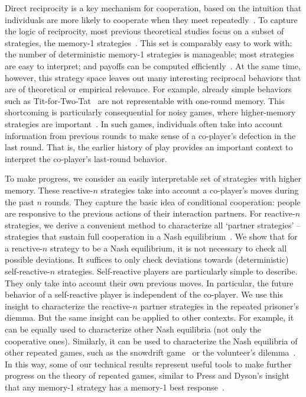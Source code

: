 \documentclass[11pt]{article}
\begin{document}
Direct reciprocity is a key mechanism for cooperation, based on the intuition that individuals are more likely to cooperate when they meet repeatedly~\citep{nowak:Science:2006}.
To capture the logic of reciprocity, most previous theoretical studies focus on a subset of strategies, the  memory-1 strategies~\citep{nowak:Nature:1993,imhof:PNAS:2005,grujic:jtb:2012,van-segbroeck:prl:2012,press:PNAS:2012,stewart:pnas:2013,Toupo:IJBC:2014,stewart:pnas:2014, akin:EGADS:2016,glynatsi:scientific:2020,chen:PNASnexus:2023}. 
This set is comparably easy to work with: 
the number of deterministic memory-1 strategies is manageable; most strategies are easy to interpret; and payoffs can be computed efficiently~\citep{sigmund2010}. 
At the same time, however, this strategy space leaves out many interesting reciprocal behaviors that are of theoretical or empirical relevance.
For example, already simple behaviors such as Tit-for-Two-Tat~\citep{axelrod:AAAS:1981} are not representable with one-round memory.
This shortcoming is particularly consequential for noisy games, where higher-memory strategies are important~\cite{fudenberg:AER:2012}. 
In such games, individuals often take into account information from previous rounds to make sense of a co-player's defection in the last round. 
That is, the earlier history of play provides an important context to interpret the co-player's last-round behavior. 

To make progress, we consider an easily interpretable set of strategies with higher memory. 
These reactive-$n$ strategies take into account a co-player's moves during the past $n$ rounds. 
They capture the basic idea of conditional cooperation: people are responsive to the previous actions of their interaction partners. 
For reactive-$n$ strategies, we derive a convenient method to characterize all `partner strategies' -- strategies that sustain full cooperation in a Nash equilibrium~\citep{akin:EGADS:2016,Hilbe:GEB:2015}. 
We show that for a reactive-$n$ strategy to be a Nash equilibrium, it is not necessary to check all possible deviations. 
It suffices to only check deviations towards (deterministic) self-reactive-$n$ strategies. 
Self-reactive players are particularly simple to describe. 
They only take into account their own previous moves. 
In particular, the future behavior of a self-reactive player is independent of the co-player. 
We use this insight to characterize the reactive-$n$ partner strategies in the repeated prisoner's diemma.
But the same insight can be applied to other contexts. 
For example, it can be equally used to characterize other Nash equilibria (not only the cooperative ones). 
Similarly, it can be used to characterize the Nash equilibria of other repeated games, such as the snowdrift game~\citep{doebeli:EL:2005} or the volunteer's dilemma~\citep{diekmann:jcr:1985}.  
In this way, some of our technical results represent useful tools to make further progress on the theory of repeated games, similar to Press and Dyson's insight that any memory-1 strategy has a memory-1 best response~\citep{press:PNAS:2012}. 
\end{document}
